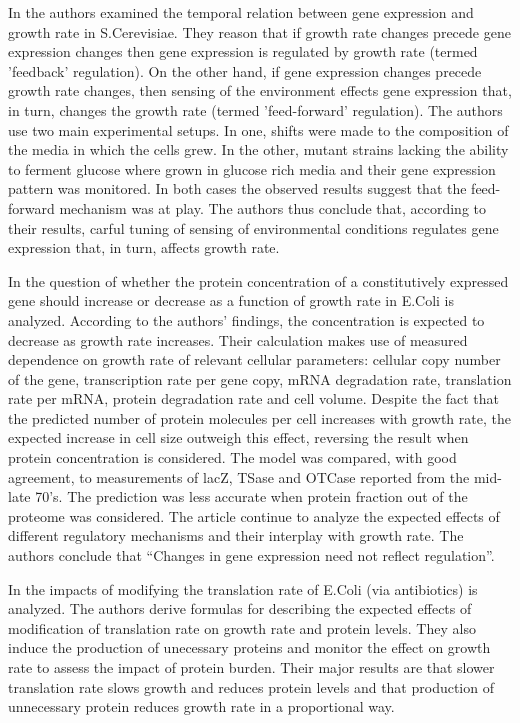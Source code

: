 \documentclass{report}
\begin{document}
In \cite{Levy2009} the authors examined the temporal relation between gene expression and growth rate in S.Cerevisiae.
They reason that if growth rate changes precede gene expression changes then gene expression is regulated by growth rate (termed 'feedback' regulation).
On the other hand, if gene expression changes precede growth rate changes, then sensing of the environment effects gene expression that, in turn, changes the growth rate (termed 'feed-forward' regulation).
The authors use two main experimental setups.
In one, shifts were made to the composition of the media in which the cells grew.
In the other, mutant strains lacking the ability to ferment glucose where grown in glucose rich media and their gene expression pattern was monitored.
In both cases the observed results suggest that the feed-forward mechanism was at play.
The authors thus conclude that, according to their results, carful tuning of sensing of environmental conditions regulates gene expression that, in turn, affects growth rate.

In \cite{Klumpp2009a} the question of whether the protein concentration of a constitutively expressed gene should increase or decrease as a function of growth rate in E.Coli is analyzed.
According to the authors' findings, the concentration is expected to decrease as growth rate increases.
Their calculation makes use of measured dependence on growth rate of relevant cellular parameters: cellular copy number of the gene, transcription rate per gene copy, mRNA degradation rate, translation rate per mRNA, protein degradation rate and cell volume.
Despite the fact that the predicted number of protein molecules per cell increases with growth rate, the expected increase in cell size outweigh this effect, reversing the result when protein concentration is considered.
The model was compared, with good agreement, to measurements of lacZ, TSase and OTCase reported from the mid-late 70's.
The prediction was less accurate when protein fraction out of the proteome was considered.
The article continue to analyze the expected effects of different regulatory mechanisms and their interplay with growth rate.
The authors conclude that ``Changes in gene expression need not reflect regulation''.

In \cite{Scott2010a} the impacts of modifying the translation rate of E.Coli (via antibiotics) is analyzed.
The authors derive formulas for describing the expected effects of modification of translation rate on growth rate and protein levels.
They also induce the production of unecessary proteins and monitor the effect on growth rate to assess the impact of protein burden.
Their major results are that slower translation rate slows growth and reduces protein levels and that production of unnecessary protein reduces growth rate in a proportional way.
\end{document}
